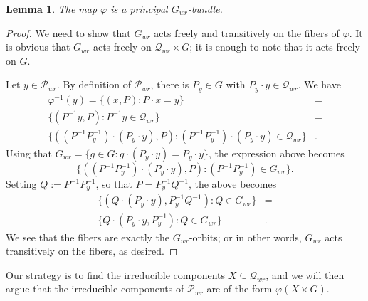 \documentclass[12pt,psamsfonts]{article}
\newtheorem{lemma}[theorem]{Lemma}
\begin{document}
\begin{lemma}\label{principal_bundle}
    The map \(\varphi\) is a principal \(G_{wr}\)-bundle.
\end{lemma}
\begin{proof}
    We need to show that \(G_{wr}\) acts freely and transitively on the fibers of \(\varphi\).
    It is obvious that \(G_{wr}\) acts freely on \(\mathcal{Q}_{wr} \times G\); it is enough to note that it acts freely on \(G\).
    \par Let \(y \in \mathcal{P}_{wr}\).
    By definition of \(\mathcal{P}_{wr}\), there is \(P_y \in G\) with \(P_y \cdot y \in \mathcal{Q}_{wr}\).
    We have
    \begin{align*}
        \varphi^{-1}(y) = \{(x, P) : P \cdot x = y \} & = \\
        \{(P^{-1} y, P) : P^{-1} y \in \mathcal{Q}_{wr} \} & = \\
        \{((P^{-1}P_y^{-1}) \cdot (P_y \cdot y), P) : (P^{-1} P_y^{-1}) \cdot (P_y \cdot y) \in \mathcal{Q}_{wr}\} & .
    \end{align*}
    Using that \(G_{wr} = \{g \in G : g \cdot (P_y \cdot y) = P_y \cdot y\}\), the expression above becomes
    \[\{((P^{-1}P_y^{-1}) \cdot (P_y \cdot y), P) : (P^{-1} P_y^{-1}) \in G_{wr}\}.\]
    Setting \(Q := P^{-1} P_y^{-1}\), so that \(P = P_y^{-1} Q^{-1}\), the above becomes
    \begin{align*}
        \{(Q \cdot (P_y \cdot y), P_y^{-1} Q^{-1}) : Q \in G_{wr}\} & = \\
        \{Q \cdot (P_y \cdot y, P_y^{-1}) : Q \in G_{wr}\} & .
    \end{align*}
        We see that the fibers are exactly the \(G_{wr}\)-orbits; or in other words, \(G_{wr}\) acts transitively on the fibers, as desired.
\end{proof}
Our strategy is to find the irreducible components \(X \subseteq \mathcal{Q}_{wr}\), and we will then argue that the irreducible components of \(\mathcal{P}_{wr}\) are of the form \(\varphi(X \times G)\).
\end{document}

